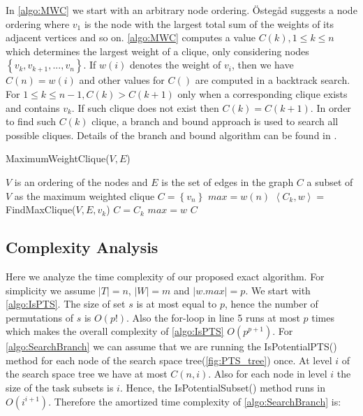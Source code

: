 In \cref{algo:MWC} we start with an arbitrary node ordering. \"{O}steg\r{a}d \cite{Ostergard01} suggests a node ordering where $v_1$ is the node with the largest total sum of the weights of its adjacent vertices and so on. \cref{algo:MWC} computes a value $C(k), 1 \leq k \leq n$ which determines the largest weight of a clique, only considering nodes $\left\{v_k, v_{k+1}, ..., v_n\right\}$. If $w(i)$ denotes the weight of $v_i$, then we have $C(n) = w(i)$ and other values for $C()$ are computed in a backtrack search. For $1 \leq k \leq n-1, C(k) > C(k+1)$ only when a corresponding clique exists and contains $v_k$. If such clique does not exist then $C(k) = C(k+1)$. In order to find such $C(k)$ clique, a branch and bound approach is used to search all possible cliques. Details of the branch and bound algorithm can be found in \cite{Ostergard01}.

\begin{algorithm}
\caption{MaximumWeightClique($V, E$)}
\label{algo:MWC}
\begin{algorithmic}[1]
\REQUIRE $V$ is an ordering of the nodes and $E$ is the set of edges in the graph
\ENSURE $C$ a subset of $V$ as the maximum weighted clique
\STATE $C = \left\{ v_n \right\}$
\STATE $max = w(n)$
	\STATE $\left\langle C_k, w \right\rangle =$ FindMaxClique($V, E, v_k$)
		\STATE $C = C_k$
		\STATE $max = w$
	\ENDIF
\ENDFOR
\RETURN $C$
\end{algorithmic}
\end{algorithm}

\subsection{Complexity Analysis}
\label{subsec:exactcomplexity}

Here we analyze the time complexity of our proposed exact algorithm. For simplicity we assume $\left\vert T \right\vert = n$, $\left\vert W \right\vert = m$ and $\left\vert w.max \right\vert = p$. We start with \cref{algo:IsPTS}. The size of set $s$ is at most equal to $p$, hence the number of permutations of $s$ is $O(p!)$. Also the for-loop in line 5 runs at most $p$ times which makes the overall complexity of \cref{algo:IsPTS} $O(p^{p+1})$. For \cref{algo:SearchBranch} we can assume that we are running the IsPotentialPTS() method for each node of the search space tree(\cref{fig:PTS_tree}) once. At level $i$ of the search space tree we have at most $C(n,i)$. Also for each node in level $i$ the size of the task subsets is $i$. Hence, the IsPotentialSubset() method runs in $O(i^{i+1})$. Therefore the amortized time complexity of \cref{algo:SearchBranch} is:

